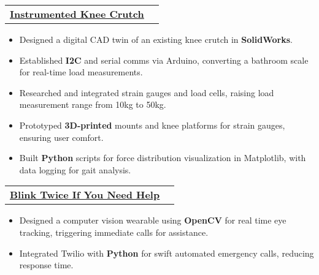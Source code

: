 \documentclass[letterpaper]{article}
\makeatletter
\newcommand{\resumeItem}[1]{
  \item\small{
    {#1 \vspace{-2pt}}
  }
}
\newcommand{\resumeProjectHeading}[2]{
    \item
    \begin{tabular*}{0.97\textwidth}{l@{\extracolsep{\fill}}r}
      \small#1 & #2 \\
    \end{tabular*}\vspace{-7pt}
}
\newcommand{\resumeItemListStart}{\begin{itemize}}
\newcommand{\resumeItemListEnd}{\end{itemize}\vspace{-5pt}}
\makeatother
\begin{document}

\resumeProjectHeading
{\textbf{\href{https://youtu.be/VAoYnhYymic?si=HT2JQz2Hzjei78vp}{\underline{Instrumented Knee Crutch}}} \emph{}}{}
\resumeItemListStart
\resumeItem{Designed a digital CAD twin of an existing knee crutch in \textbf{SolidWorks}.}
\resumeItem{Established \textbf{I2C} and serial comms via Arduino, converting a bathroom scale for real-time load measurements.}
\resumeItem{Researched and integrated strain gauges and load cells, raising load measurement range from 10kg to 50kg.}
\resumeItem{Prototyped \textbf{3D-printed} mounts and knee platforms for strain gauges, ensuring user comfort.}
\resumeItem{Built \textbf{Python} scripts for force distribution visualization in Matplotlib, with data logging for gait analysis.}
\resumeItemListEnd


\resumeProjectHeading
{\textbf{\href{https://devpost.com/software/blink-twice-if-you-need-help}{\underline{Blink Twice If You Need Help}}} \emph{}}{}
\resumeItemListStart
\resumeItem{Designed a computer vision wearable using \textbf{OpenCV} for real time eye tracking, triggering immediate calls for assistance.}
\resumeItem{Integrated Twilio with \textbf{Python} for swift automated emergency calls, reducing response time.}
\resumeItemListEnd
\end{document}

